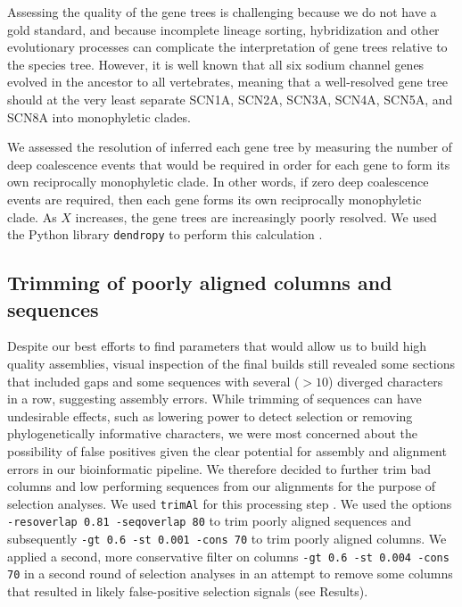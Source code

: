 \documentclass{article}
\begin{document}
Assessing the quality of the gene trees is challenging because we do not have a gold standard, and because incomplete lineage sorting, hybridization and other evolutionary processes can complicate the interpretation of gene trees relative to the species tree.  However, it is well known that all six sodium channel genes evolved in the ancestor to all vertebrates, meaning that a well-resolved gene tree should at the very least separate SCN1A, SCN2A, SCN3A, SCN4A, SCN5A, and SCN8A into monophyletic clades.

We assessed the resolution of inferred each gene tree by measuring the number of deep coalescence events that would be required in order for each gene to form its own reciprocally monophyletic clade.  In other words, if zero deep coalescence events are required, then each gene forms its own reciprocally monophyletic clade.  As $X$ increases, the gene trees are increasingly poorly resolved. We used the Python library \texttt{dendropy} to perform this calculation \cite{sukumaran2010dendropy}.

\subsection*{Trimming of poorly aligned columns and sequences}

Despite our best efforts to find parameters that would allow us to build high quality assemblies, visual inspection of the final builds still revealed some sections that included gaps and some sequences with several ($>10$) diverged characters in a row, suggesting assembly errors. While trimming of sequences can have undesirable effects, such as lowering power to detect selection or removing phylogenetically informative characters, we were most concerned about the possibility of false positives given the clear potential for assembly and alignment errors in our bioinformatic pipeline. We therefore decided to further trim bad columns and low performing sequences from our alignments for the purpose of selection analyses. We used \texttt{trimAl} for this processing step \citep{capella2009trimal}. We used the options \texttt{ -resoverlap 0.81 -seqoverlap 80} to trim poorly aligned sequences and subsequently \texttt{-gt 0.6 -st 0.001 -cons 70} to trim poorly aligned columns. We applied a second, more conservative filter on columns  \texttt{-gt 0.6 -st 0.004 -cons 70} in a second round of selection analyses in an attempt to remove some columns that resulted in likely false-positive selection signals (see Results).
\end{document}
